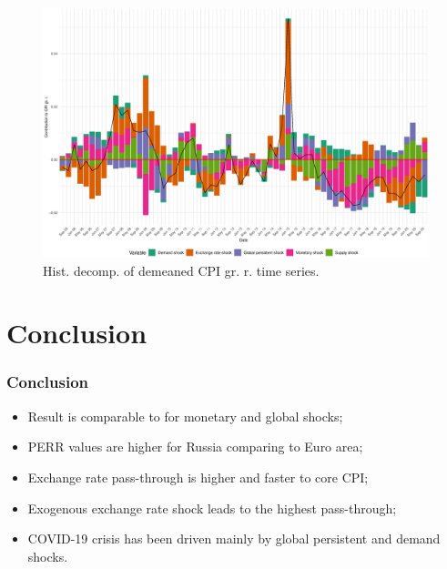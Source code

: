 \documentclass{beamer}
\begin{document}
\begin{frame}
\begin{figure}[h!]
	\centering
	\includegraphics[width=1\linewidth]{../Text/figures/hd_cpi_full}
	\caption[]{Hist. decomp. of demeaned CPI gr. r. time series.}
	\label{fig:hd_cpi_full}
\end{figure}
\end{frame}

\section{Conclusion}
\begin{frame}
\frametitle{Conclusion}
	\begin{itemize}
		\item Result is comparable to \parencite{Khotulev2020} for monetary and global shocks;
		\item PERR values are higher for Russia comparing to Euro area;
		\item Exchange rate pass-through is higher and faster to core CPI;
		\item Exogenous exchange rate shock leads to the highest pass-through;
		\item COVID-19 crisis has been driven mainly by global persistent and demand shocks.
	\end{itemize}
\end{frame}
\end{document}

